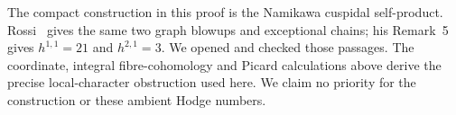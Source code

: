 The compact construction in this proof is the Namikawa
cuspidal self-product. Rossi~\cite[\S3, Proposition~4]{Rossi2017}
gives the same two graph blowups and exceptional chains;
his Remark~5 gives $h^{1,1}=21$ and $h^{2,1}=3$.
We opened and checked those passages. The coordinate,
integral fibre-cohomology and Picard calculations above
derive the precise local-character obstruction used here.
We claim no priority for the construction or these
ambient Hodge numbers.
